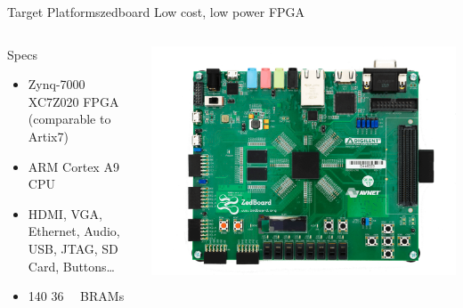\begin{frame}{Target Platforms}{zedboard}
    Low cost, low power FPGA
    \begin{columns}[T]
      \begin{column}{.5\textwidth}
        \begin{block}{Specs}
          \begin{itemize}
            \item Zynq-7000 XC7Z020 FPGA (comparable to Artix7)
            \item ARM Cortex A9 CPU
            \item HDMI, VGA, Ethernet, Audio, USB, JTAG, SD Card, Buttons\ldots
            \item 140 \SI{36}{\kilo\bit} BRAMs
          \end{itemize}
        \end{block}
      \end{column}
      \begin{column}{.45\textwidth}
        \includegraphics[width=\textwidth]{data/zedboard.png}
      \end{column}
    \end{columns}
\end{frame}

